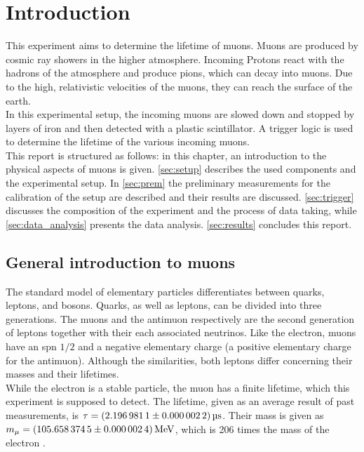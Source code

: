 \chapter{Introduction}
This experiment aims to determine the lifetime of muons. Muons are produced by cosmic ray showers 
in the higher atmosphere. Incoming Protons react with the hadrons of the atmosphere and produce 
pions, which can decay into muons. Due to the high, relativistic velocities of the muons, they can 
reach the surface of the earth. \\
In this experimental setup, the incoming muons are slowed down and stopped
by layers of iron and then detected with a plastic scintillator. A trigger logic is used to determine 
the lifetime of the various incoming muons.\\
This report is structured as follows: in this chapter, an introduction to the physical aspects of muons is given.
\autoref{sec:setup} describes the used components and the experimental setup. In \autoref{sec:prem}
the preliminary measurements for the calibration of the setup are described and their results are discussed. \autoref{sec:trigger} discusses
the composition of the experiment and the process of data taking, while \autoref{sec:data_analysis} 
presents the data analysis. \autoref{sec:results} concludes this report.


\newpage
\section{General introduction to muons}
The standard model of elementary particles differentiates between quarks, leptons, and bosons.
Quarks, as well as leptons, can be divided into three generations. The muons and the antimuon respectively 
are the second generation of leptons together with their each associated neutrinos. Like the electron,
muons have an spn $1/2$ and a negative elementary charge (a positive elementary charge for the antimuon).
Although the similarities, both leptons differ concerning their masses and their lifetimes.\\
While the electron is a stable particle, the muon has a finite lifetime, which this experiment is supposed 
to detect. The lifetime, given as an average result of past measurements, is $\tau = \SI{2.1969811 \pm 0.0000022}{\micro\second}$.
Their mass is given as $m_{\mu} = \SI{105.6583745 \pm 0.0000024}{\mega\eV}$, which 
is 206 times the mass of the electron \cite{pdg}.
